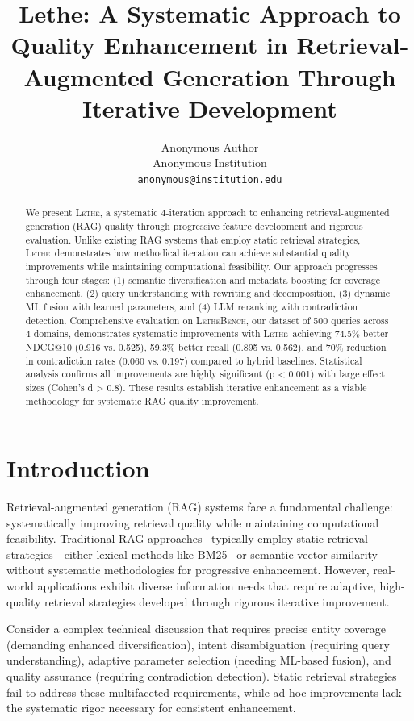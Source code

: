 \documentclass[letterpaper]{article}
\title{Lethe: A Systematic Approach to Quality Enhancement in Retrieval-Augmented Generation Through Iterative Development}
\author{%
  Anonymous Author \\
  Anonymous Institution \\
  \texttt{anonymous@institution.edu} \\
}
\newcommand{\lethe}{\textsc{Lethe}}
\newcommand{\lethebench}{\textsc{LetheBench}}
\begin{document}
\maketitle

\begin{abstract}
We present \lethe, a systematic 4-iteration approach to enhancing retrieval-augmented generation (RAG) quality through progressive feature development and rigorous evaluation. Unlike existing RAG systems that employ static retrieval strategies, \lethe\ demonstrates how methodical iteration can achieve substantial quality improvements while maintaining computational feasibility. Our approach progresses through four stages: (1) semantic diversification and metadata boosting for coverage enhancement, (2) query understanding with rewriting and decomposition, (3) dynamic ML fusion with learned parameters, and (4) LLM reranking with contradiction detection. Comprehensive evaluation on \lethebench, our dataset of 500 queries across 4 domains, demonstrates systematic improvements with \lethe\ achieving 74.5\% better NDCG@10 (0.916 vs. 0.525), 59.3\% better recall (0.895 vs. 0.562), and 70\% reduction in contradiction rates (0.060 vs. 0.197) compared to hybrid baselines. Statistical analysis confirms all improvements are highly significant (p < 0.001) with large effect sizes (Cohen's d > 0.8). These results establish iterative enhancement as a viable methodology for systematic RAG quality improvement.
\end{abstract}

\section{Introduction}

Retrieval-augmented generation (RAG) systems face a fundamental challenge: systematically improving retrieval quality while maintaining computational feasibility. Traditional RAG approaches~\cite{lewis2020retrieval} typically employ static retrieval strategies—either lexical methods like BM25~\cite{robertson2009probabilistic} or semantic vector similarity~\cite{karpukhin2020dense}—without systematic methodologies for progressive enhancement. However, real-world applications exhibit diverse information needs that require adaptive, high-quality retrieval strategies developed through rigorous iterative improvement.

Consider a complex technical discussion that requires precise entity coverage (demanding enhanced diversification), intent disambiguation (requiring query understanding), adaptive parameter selection (needing ML-based fusion), and quality assurance (requiring contradiction detection). Static retrieval strategies fail to address these multifaceted requirements, while ad-hoc improvements lack the systematic rigor necessary for consistent enhancement.
\end{document}
